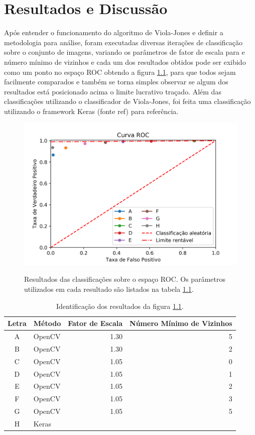 \chapter{Resultados e Discussão}\label{cap:resultados}

Após entender o funcionamento do algoritmo de Viola-Jones e definir a metodologia para análise, foram executadas diversas iterações de classificação sobre o conjunto de imagens, variando os parâmetros de fator de escala para e número mínimo de vizinhos e cada um dos resultados obtidos pode ser exibido como um ponto no espaço ROC obtendo a figura \ref{fig:results_roc}, para que todos sejam facilmente comparados e também se torna simples observar se algum dos resultados está posicionado acima o limite lucrativo traçado. Além das classificações utilizando o classificador de Viola-Jones, foi feita uma classificação utilizando o framework Keras (fonte ref{}) para referência. 

\begin{figure}[htbp]
     \centering
     \caption{Resultados das classificações sobre o espaço ROC. Os parâmetros utilizados em cada resultado são listados na tabela \ref{tab:results_identify}.}
     \includegraphics[scale=1]{figs/curva_roc_results.png}
     \label{fig:results_roc}
 \end{figure}

 \begin{table}[htbp]
     \caption{Identificação dos resultados da figura \ref{fig:results_roc}.}
     \label{tab:results_identify}
     \centering
     \begin{tabular}{clrr}
      Letra & Método & Fator de Escala & Número Mínimo de Vizinhos \\
      \midrule
           A & OpenCV & 1.30 & 5 \\
           B & OpenCV & 1.30 & 2 \\
           C & OpenCV & 1.05 & 0 \\
           D & OpenCV & 1.05 & 1 \\
           E & OpenCV & 1.05 & 2 \\
           F & OpenCV & 1.05 & 3 \\
           G & OpenCV & 1.05 & 5 \\
           H & Keras & & \\
      \end{tabular}
 \end{table}

